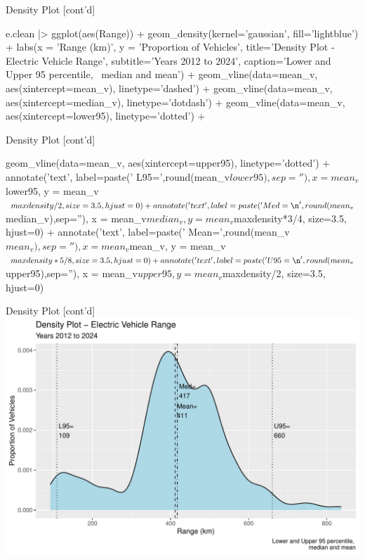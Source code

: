 \documentclass[ignorenonframetext,xcolor=x11names]{beamer}
\begin{document}
\begin{frame}[fragile]{Density Plot \small [cont'd]}
\footnotesize
\begin{Rcode}
e.clean |>
  ggplot(aes(Range)) + 
    geom_density(kernel='gaussian', 
                 fill='lightblue') + 
    labs(x = 'Range (km)', 
         y = 'Proportion of Vehicles', 
         title='Density Plot - Electric Vehicle Range', 
         subtitle='Years 2012 to 2024', 
         caption='Lower and Upper 95 percentile, \
                  median and mean') +
    geom_vline(data=mean_v, 
               aes(xintercept=mean_v), 
               linetype='dashed') +
    geom_vline(data=mean_v, 
               aes(xintercept=median_v), 
               linetype='dotdash') +
    geom_vline(data=mean_v, 
               aes(xintercept=lower95), 
               linetype='dotted') +
\end{Rcode}
\end{frame}

\begin{frame}[fragile]{Density Plot \small [cont'd]}
\footnotesize
\begin{Rcode}
geom_vline(data=mean_v, 
           aes(xintercept=upper95), 
           linetype='dotted') + 
annotate('text', 
   label=paste(' L95=\n ',round(mean_v$lower95),sep=''), 
   x = mean_v$lower95, y = mean_v$maxdensity/2, 
   size=3.5, hjust=0) +
annotate('text', 
   label=paste(' Med=\n ',round(mean_v$median_v),sep=''), 
   x = mean_v$median_v, y = mean_v$maxdensity*3/4, 
   size=3.5, hjust=0) +
annotate('text',
   label=paste(' Mean=\n ',round(mean_v$mean_v),sep=''), 
   x = mean_v$mean_v, y = mean_v$maxdensity*5/8, 
   size=3.5, hjust=0) + 
annotate('text',
   label=paste(' U95=\n ',round(mean_v$upper95),sep=''), 
   x = mean_v$upper95, y = mean_v$maxdensity/2, 
   size=3.5, hjust=0)
\end{Rcode}
\end{frame}

\begin{frame}{Density Plot [cont'd]}
  \includegraphics[width=\textwidth]{fuel.density.pdf}
\end{frame}
\end{document}

